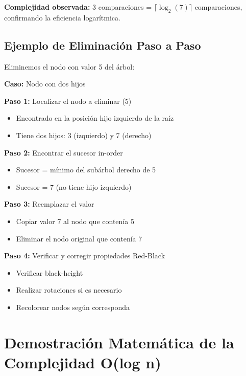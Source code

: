 \documentclass[conference]{IEEEtran}
\begin{document}
\textbf{Complejidad observada:} 3 comparaciones = $\lceil \log_2(7) \rceil$ comparaciones, confirmando la eficiencia logarítmica.

\subsection{Ejemplo de Eliminación Paso a Paso}

Eliminemos el nodo con valor 5 del árbol:

\textbf{Caso:} Nodo con dos hijos

\textbf{Paso 1:} Localizar el nodo a eliminar (5)
\begin{itemize}
    \item Encontrado en la posición hijo izquierdo de la raíz
    \item Tiene dos hijos: 3 (izquierdo) y 7 (derecho)
\end{itemize}

\textbf{Paso 2:} Encontrar el sucesor in-order
\begin{itemize}
    \item Sucesor = mínimo del subárbol derecho de 5
    \item Sucesor = 7 (no tiene hijo izquierdo)
\end{itemize}

\textbf{Paso 3:} Reemplazar el valor
\begin{itemize}
    \item Copiar valor 7 al nodo que contenía 5
    \item Eliminar el nodo original que contenía 7
\end{itemize}

\textbf{Paso 4:} Verificar y corregir propiedades Red-Black
\begin{itemize}
    \item Verificar black-height
    \item Realizar rotaciones si es necesario
    \item Recolorear nodos según corresponda
\end{itemize}


\section{Demostración Matemática de la Complejidad O(log n)}
\end{document}
